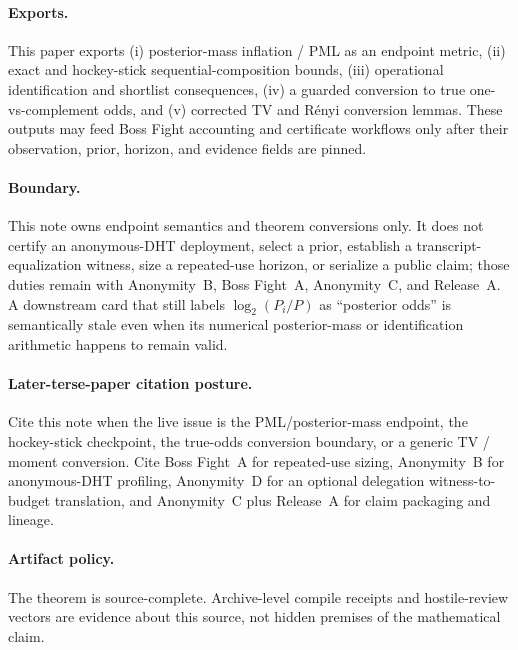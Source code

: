 \documentclass[11pt]{article}
\theoremstyle{definition}
\theoremstyle{remark}
\begin{document}
\paragraph{Exports.}
This paper exports (i) posterior-mass inflation / PML as an endpoint metric, (ii) exact and hockey-stick sequential-composition bounds, (iii) operational identification and shortlist consequences, (iv) a guarded conversion to true one-vs-complement odds, and (v) corrected TV and R\'enyi conversion lemmas.
These outputs may feed Boss Fight accounting and certificate workflows only after their observation, prior, horizon, and evidence fields are pinned.\cite{series:endpointbridge}

\paragraph{Boundary.}
This note owns endpoint semantics and theorem conversions only.
It does not certify an anonymous-DHT deployment, select a prior, establish a transcript-equalization witness, size a repeated-use horizon, or serialize a public claim; those duties remain with Anonymity~B, Boss Fight~A, Anonymity~C, and Release~A.\cite{series:bossfightA,series:profiling,series:abomoinl,series:releaseA}
A downstream card that still labels $\log_2(P_i/P)$ as ``posterior odds'' is semantically stale even when its numerical posterior-mass or identification arithmetic happens to remain valid.

\paragraph{Later-terse-paper citation posture.}
Cite this note when the live issue is the PML/posterior-mass endpoint, the hockey-stick checkpoint, the true-odds conversion boundary, or a generic TV / moment conversion.
Cite Boss Fight~A for repeated-use sizing, Anonymity~B for anonymous-DHT profiling, Anonymity~D for an optional delegation witness-to-budget translation, and Anonymity~C plus Release~A for claim packaging and lineage.\cite{series:bossfightA,series:profiling,series:spectral2budget,series:abomoinl,series:releaseA}

\paragraph{Artifact policy.}
The theorem is source-complete. Archive-level compile receipts and hostile-review vectors are evidence about this source, not hidden premises of the mathematical claim.\cite{series:artifactpolicy}
\end{document}
